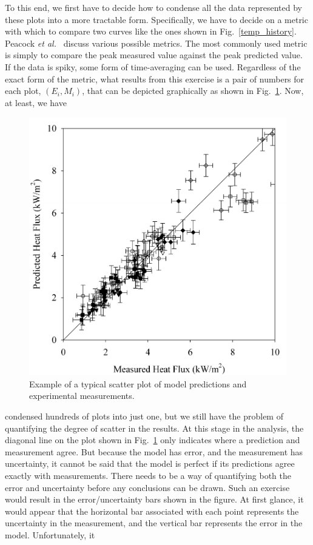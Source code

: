To this end, we first have to decide how to condense all the data represented by these plots into a more tractable form. Specifically, we
have to decide on a metric with which to compare two curves like the ones shown in Fig.~\ref{temp_history}. Peacock {\em et al.}~\cite{Peacock:FSJ1999} discuss various possible metrics. The most commonly used metric is simply to compare the peak measured value against the peak
predicted value. If the data is spiky, some form of time-averaging can be used. Regardless of the exact form of the metric, what results from
this exercise is a pair of numbers for each plot, $(E_i,M_i)$, that can be depicted graphically as shown in Fig.~\ref{scatterplot}. Now, at least, we have
\begin{figure}[ht]
\begin{center}
\includegraphics[height=3.in]{FIGURES/scatterplot}
\end{center}
\caption[Sample scatter plot.]{Example of a typical scatter plot of model predictions and experimental measurements.}
\label{scatterplot}
\end{figure}
condensed hundreds of plots into just one, but we still have the problem of quantifying the degree of scatter in the results. At this stage in the analysis, the
diagonal line on the plot shown in Fig.~\ref{scatterplot} only indicates where a prediction and measurement agree. But because the model has error, and
the measurement has uncertainty, it cannot be said that the model is perfect if its predictions agree exactly with measurements. There needs to be a way of quantifying
both the error and uncertainty before any conclusions can be drawn.
Such an exercise would result in the error/uncertainty bars shown in the figure. At first glance, it would appear that the
horizontal bar associated with each point represents the uncertainty in the measurement, and the vertical bar represents the error in the model. Unfortunately, it
